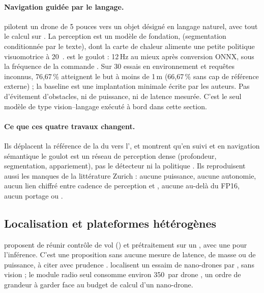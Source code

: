 \paragraph{Navigation guidée par le langage.} \citet{arxiv-2509.18610-singer-onboard-generalist-vision-language}\pp{}
pilotent un drone de 5 pouces vers un objet désigné en langage naturel, avec tout le calcul
sur . La perception est un modèle de fondation,  (segmentation
conditionnée par le texte), dont la carte de chaleur alimente une petite politique
visuomotrice à 20\, .  est le goulot : 12\,Hz au mieux après conversion
ONNX, sous la fréquence de la commande . Sur 30 essais en environnement et
requêtes inconnus, 76,67\,\% atteignent le but à moins de 1\,m (66,67\,\% sans cap de
référence externe) \med ; la baseline est une implantation minimale écrite par
les auteurs. Pas d'évitement d'obstacles, ni de puissance, ni de latence mesurée. C'est le
seul modèle de type vision--langage exécuté à bord dans cette section.

\paragraph{Ce que ces quatre travaux changent.} Ils déplacent la référence de la  du  vers l', et montrent qu'en suivi et en navigation sémantique le goulot
est un réseau de perception dense (profondeur, segmentation, appariement), pas le
détecteur ni la politique \deduit. Ils reproduisent aussi les manques de la littérature
Zurich : aucune puissance, aucune autonomie, aucun lien chiffré entre cadence de
perception et , aucune  au-delà du FP16, aucun portage
 ou .

\subsection{Localisation et plateformes hétérogènes}

\citet{2021-guo-fpga-uav-heterogeneous-computing-platform} proposent de réunir contrôle
de vol () et prétraitement sur un , avec une  pour
l'inférence. C'est une proposition sans aucune mesure de latence, de masse ou de puissance,
à citer avec prudence . \citet{arxiv-2307.10255-land-localize-infrastructure-free-scalable}\pp{}
localisent un essaim de nano-drones par , sans vision ; le module radio seul consomme
environ 350\, par drone , un ordre de grandeur à garder face au budget de
calcul d'un nano-drone.

